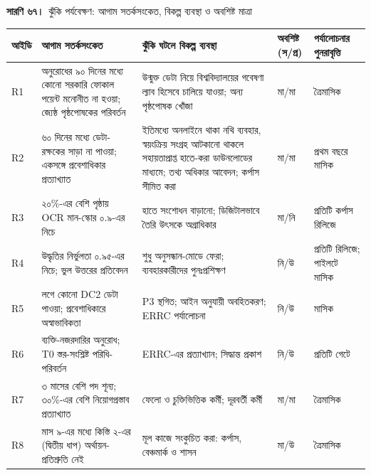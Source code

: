 \documentclass[border=10pt]{standalone}
\begin{document}
\begin{minipage}{17cm}
{\large\bfseries সারণি ৬৭।}\ {\large ঝুঁকি পর্যবেক্ষণ: আগাম সতর্কসংকেত, বিকল্প ব্যবস্থা ও অবশিষ্ট মাত্রা}\par\vspace{7pt}
\small
{}
\begin{tabularx}{\linewidth}{@{}>{\hsize=0.326\hsize\raggedright\arraybackslash}X>{\hsize=1.630\hsize\raggedright\arraybackslash}X>{\hsize=1.522\hsize\raggedright\arraybackslash}X>{\hsize=0.652\hsize\raggedright\arraybackslash}X>{\hsize=0.870\hsize\raggedright\arraybackslash}X@{}}
\arrayrulecolor{bapilrule}\toprule
\rowcolor{white}\textbf{আইডি} & \textbf{আগাম সতর্কসংকেত} & \textbf{ঝুঁকি ঘটলে বিকল্প ব্যবস্থা} & \textbf{অবশিষ্ট (স/\allowbreak{}প্র)} & \textbf{পর্যালোচনার পুনরাবৃত্তি} \\
\midrule
R1 & অনুরোধের ৯০ দিনের মধ্যে কোনো সরকারি ফোকাল পয়েন্ট মনোনীত না হওয়া; জ্যেষ্ঠ পৃষ্ঠপোষকের পরিবর্তন & উন্মুক্ত ডেটা নিয়ে বিশ্ববিদ্যালয়ের গবেষণা ল্যাব হিসেবে চালিয়ে যাওয়া; অন্য পৃষ্ঠপোষক খোঁজা & মা/\allowbreak{}মা & ত্রৈমাসিক \\
R2 & ৬০ দিনের মধ্যে ডেটা-রক্ষকের সাড়া না পাওয়া; একসঙ্গে প্রবেশাধিকার প্রত্যাখ্যাত & ইতিমধ্যে অনলাইনে থাকা নথি ব্যবহার, স্বয়ংক্রিয় সংগ্রহ আটকানো থাকলে সহায়তাপ্রাপ্ত হাতে-করা ডাউনলোডের মাধ্যমে; তথ্য অধিকার আবেদন; কর্পাস সীমিত করা & মা/\allowbreak{}মা & প্রথম বছরে মাসিক \\
R3 & ২০\%-এর বেশি পৃষ্ঠায় OCR মান-স্কোর ০.৯-এর নিচে & হাতে সংশোধন বাড়ানো; ডিজিটালভাবে তৈরি উৎসকে অগ্রাধিকার & মা/\allowbreak{}নি & প্রতিটি কর্পাস রিলিজে \\
R4 & উদ্ধৃতির নির্ভুলতা ০.৯৫-এর নিচে; ভুল উত্তরের প্রতিবেদন & শুধু অনুসন্ধান-মোডে ফেরা; ব্যবহারকারীদের পুনঃপ্রশিক্ষণ & নি/\allowbreak{}উ & প্রতিটি রিলিজে; পাইলটে মাসিক \\
R5 & লগে কোনো DC2 ডেটা পাওয়া; প্রবেশাধিকারে অস্বাভাবিকতা & P3 স্থগিত; আইন অনুযায়ী অবহিতকরণ; ERRC পর্যালোচনা & নি/\allowbreak{}উ & মাসিক \\
R6 & ব্যক্তি-নজরদারির অনুরোধ; T0 স্তর-সংশ্লিষ্ট পরিধি-পরিবর্তন & ERRC-এর প্রত্যাখ্যান; সিদ্ধান্ত প্রকাশ & নি/\allowbreak{}উ & প্রতিটি গেটে \\
R7 & ৩ মাসের বেশি পদ শূন্য; ৩০\%-এর বেশি নিয়োগপ্রস্তাব প্রত্যাখ্যাত & ফেলো ও চুক্তিভিত্তিক কর্মী; দূরবর্তী কর্মী & মা/\allowbreak{}মা & ত্রৈমাসিক \\
R8 & মাস ৯-এর মধ্যে কিস্তি ২-এর (দ্বিতীয় ধাপ) অর্থায়ন-প্রতিশ্রুতি নেই & মূল কাজে সংকুচিত করা: কর্পাস, বেঞ্চমার্ক ও শাসন & মা/\allowbreak{}উ & ত্রৈমাসিক \\

\end{tabularx}
\end{minipage}
\end{document}
